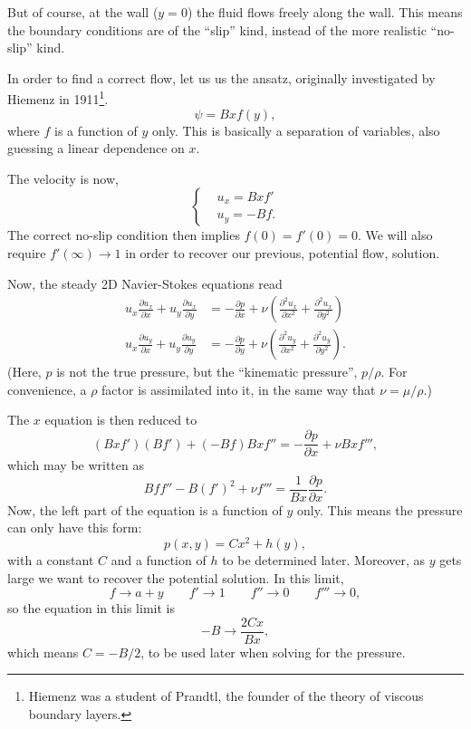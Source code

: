 But of course, at the wall ($y=0$) the fluid flows freely along the
wall. This means the boundary conditions are of the ``slip'' kind,
instead of the more realistic ``no-slip'' kind.

In order to find a correct flow, let us us the ansatz, originally
investigated by Hiemenz in 1911\footnote{%
  Hiemenz was a student of Prandtl, the founder of the theory of
  viscous boundary layers.
}.
  \[
\psi = B x f(y) ,
\]
where $f$ is a function of $y$ only. This is basically a separation of
variables, also guessing a linear dependence on $x$.

The velocity is now,
\[
\begin{cases}
  & u_x =   B x f' \\
  & u_y = - B f .
\end{cases}
\]
The correct no-slip condition then implies $f(0)=f'(0)=0$. We will
also require $f'(\infty)\to 1$ in order to recover our previous,
potential flow, solution.

Now, the steady 2D Navier-Stokes equations read
\begin{align}
  u_x  \frac{\partial u_x}{\partial x} +
  u_y  \frac{\partial u_x}{\partial y} 
  & =   - \frac{\partial p}{\partial x} +
  \nu
  \left(
  \frac{\partial^2 u_x}{\partial x^2} +
  \frac{\partial^2 u_x}{\partial y^2}
  \right) \\
  u_x  \frac{\partial u_y}{\partial x} +
  u_y  \frac{\partial u_y}{\partial y} 
  & =   - \frac{\partial p}{\partial y} +
  \nu
  \left(
  \frac{\partial^2 u_y}{\partial x^2} +
  \frac{\partial^2 u_y}{\partial y^2}
  \right) .
\end{align}
(Here, $p$ is not the true pressure, but the ``kinematic pressure'',
$p/\rho$. For convenience, a $\rho$ factor is assimilated into it, in
the same way that $\nu=\mu/\rho$.)

The $x$ equation is then reduced to
\[
 (B x f') (B f') + (-B f) B x f'' =  - \frac{\partial p}{\partial x} +
\nu B x f''' ,
\]
which may be written as
\[
B f f'' - B (f')^2 + \nu f''' = \frac{1}{B x} \frac{\partial
  p}{\partial x}  .
\]
Now, the left part of the equation is a function of $y$ only. This
means the pressure can only have this form:
\[
p(x,y) = C x^2 + h(y) ,
\]
with a constant $C$ and a function of $h$ to be determined later. Moreover,
as $y$ gets large we want to recover the potential solution. In this limit,
\[
f \to a + y \qquad f' \to 1 \qquad f'' \to 0 \qquad f'''\to 0 ,
\]
so the equation in this limit is
\[
- B \to  \frac{2 C x }{B x} ,
\]
which means $C =-B/2$, to be used later when solving for the pressure.

